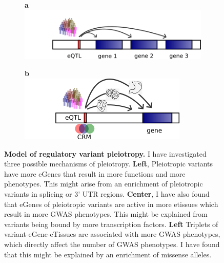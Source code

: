 %
\begin{figure}[!tbp]
    \centering
%
    \begin{subfigure}[]{0.95\textwidth}
        \textbf{a}
        \\
        \includegraphics[width=\textwidth]{fig/model1.png}
    \end{subfigure}
%
    \begin{subfigure}[]{0.95\textwidth}
        \textbf{b}
        \\
        \includegraphics[width=\textwidth]{fig/model2.png}
    \end{subfigure}

    \caption{\textbf{Model of regulatory variant pleiotropy.} I have investigated three possible mechanisms of pleiotropy. \textbf{Left}, Pleiotropic variants have more eGenes that result in more functions and more phenotypes. This might arise from an enrichment of pleiotropic variants in splicing or 3' UTR regions. \textbf{Center}, I have also found that eGenes of pleiotropic variants are active in more etissues which result in more GWAS phenotypes. This might be explained from variants being bound by more transcription factors. \textbf{Left} Triplets of variant-eGene-eTissues are associated with more GWAS phenotypes, which directly affect the number of GWAS phenotypes. I have found that this might be explained by an enrichment of missense alleles.} \label{fig:beta}
%
\end{figure}

